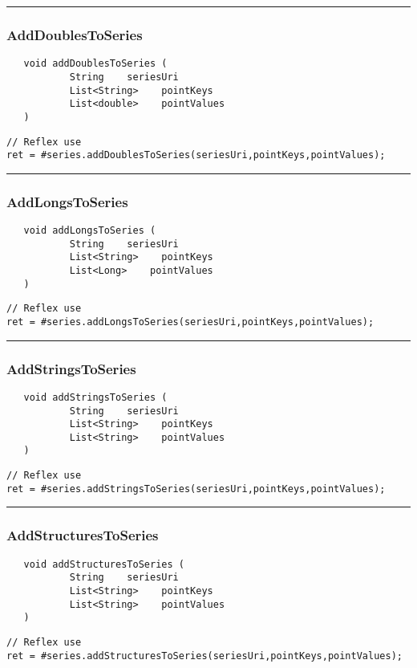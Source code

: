 \rule{15cm}{2pt}
\subsubsection{AddDoublesToSeries}
\label{Api:AddDoublesToSeries}
\begin{verbatim}
   void addDoublesToSeries (
           String    seriesUri
           List<String>    pointKeys
           List<double>    pointValues
   )
\end{verbatim}
\begin{lstlisting}[language=reflex]
// Reflex use
ret = #series.addDoublesToSeries(seriesUri,pointKeys,pointValues);
\end{lstlisting}



\rule{15cm}{2pt}
\subsubsection{AddLongsToSeries}
\label{Api:AddLongsToSeries}
\begin{verbatim}
   void addLongsToSeries (
           String    seriesUri
           List<String>    pointKeys
           List<Long>    pointValues
   )
\end{verbatim}
\begin{lstlisting}[language=reflex]
// Reflex use
ret = #series.addLongsToSeries(seriesUri,pointKeys,pointValues);
\end{lstlisting}



\rule{15cm}{2pt}
\subsubsection{AddStringsToSeries}
\label{Api:AddStringsToSeries}
\begin{verbatim}
   void addStringsToSeries (
           String    seriesUri
           List<String>    pointKeys
           List<String>    pointValues
   )
\end{verbatim}
\begin{lstlisting}[language=reflex]
// Reflex use
ret = #series.addStringsToSeries(seriesUri,pointKeys,pointValues);
\end{lstlisting}



\rule{15cm}{2pt}
\subsubsection{AddStructuresToSeries}
\label{Api:AddStructuresToSeries}
\begin{verbatim}
   void addStructuresToSeries (
           String    seriesUri
           List<String>    pointKeys
           List<String>    pointValues
   )
\end{verbatim}
\begin{lstlisting}[language=reflex]
// Reflex use
ret = #series.addStructuresToSeries(seriesUri,pointKeys,pointValues);
\end{lstlisting}



